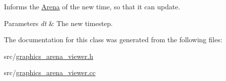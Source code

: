 Informs the \hyperlink{classArena}{Arena} of the new time, so that it can update. 


\begin{DoxyParams}{Parameters}
{\em dt} & The new timestep. \\
\hline
\end{DoxyParams}


The documentation for this class was generated from the following files\+:\begin{DoxyCompactItemize}
\item 
src/\hyperlink{graphics__arena__viewer_8h}{graphics\+\_\+arena\+\_\+viewer.\+h}\item 
src/\hyperlink{graphics__arena__viewer_8cc}{graphics\+\_\+arena\+\_\+viewer.\+cc}\end{DoxyCompactItemize}
